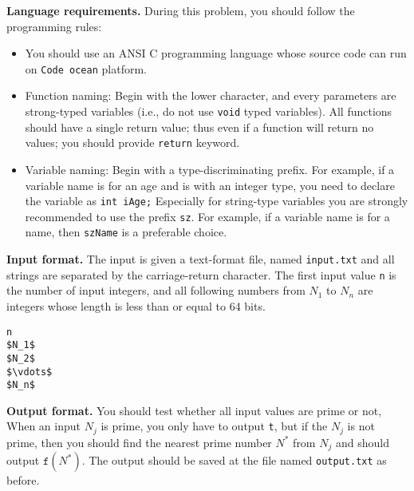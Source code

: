 \documentclass{article}
\begin{document}
\bigskip
\noindent\textbf{Language requirements. }%
During this problem, you should follow the programming rules:
\begin{itemize}
\item You should use an ANSI C programming language whose source code can run on \texttt{Code ocean} platform. 
\item Function naming: Begin with the lower character, and every parameters are strong-typed variables (i.e., do not use \texttt{void} typed variables).
	All functions should have a single return value; thus even if a function will return no values; you should provide \texttt{return} keyword.
\item Variable naming: Begin with a type-discriminating prefix. For example, if a variable name is for an age and is with an integer type,
	you need to declare the variable as \texttt{int iAge;}  Especially for string-type variables you are strongly recommended to use the prefix \texttt{sz}.
	For example, if a variable name is for a name, then \texttt{szName} is a preferable choice.
\end{itemize}

\bigskip
\noindent\textbf{Input format.} %
The input is given a text-format file, named \texttt{input.txt} and all strings are separated by the carriage-return character.
The first input value \texttt{n} is the number of input integers, and all following numbers from $N_1$ to $N_n$ are integers
whose  length is less than or equal to 64 bits.
\begin{lstlisting}
n
$N_1$ 
$N_2$ 
$\vdots$
$N_n$
\end{lstlisting}

\bigskip
\noindent\textbf{Output format.} %
You should test whether all input values are prime or not, When an input $N_j$ is prime, you only have to output \texttt{t}, but 
if the $N_j$ is not prime, then you should find the nearest prime number $N^\ast$ from $N_j$ and should output $\texttt{f}(N^\ast)$.
The output should be saved at the file named \texttt{output.txt} as before.
\end{document}
